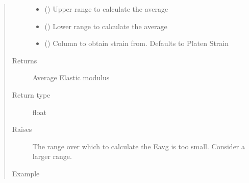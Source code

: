 \documentclass[letterpaper,10pt,english]{sphinxmanual}
\begin{document}
\begin{fulllineitems}
\begin{fulllineitems}
\begin{quote}
\begin{description}
\begin{itemize}
\item {} 
 () \textendash{} Upper range to calculate the average

\item {} 
 () \textendash{} Lower range to calculate the average

\item {} 
 () \textendash{} Column to obtain strain from. Defaults to Platen Strain

\end{itemize}

\item[{Returns}] \leavevmode
Average Elastic modulus

\item[{Return type}] \leavevmode
float

\item[{Raises}] \leavevmode
{} \textendash{} The range over which to calculate the Eavg is too small. Consider a larger range.

\item[{Example}] \leavevmode
\begin{sphinxVerbatim}[commandchars=\\\{\}]
  
  
  
   
\end{sphinxVerbatim}


\end{description}
\end{quote}
\end{fulllineitems}
\end{fulllineitems}
\end{document}
